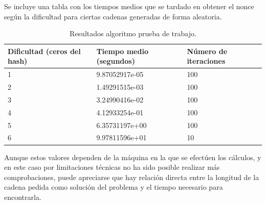 Se incluye una tabla con los tiempos medios que se tardado en obtener el nonce según la dificultad para ciertas cadenas generadas de forma aleatoria.
\begin{table}[htb]
\centering
\begin{tabular}{|l|l|l|}

\hline
Dificultad (ceros del hash)  & Tiempo medio (segundos) & Número de iteraciones \\
\hline \hline
1 & 9.87052917e-05 & 100\\ \hline
2 & 1.49291515e-03 & 100\\ \hline
3 & 3.24990416e-02 & 100\\ \hline
4 & 4.12933254e-01 & 100\\ \hline
5 & 6.35731197e+00 & 100\\ \hline
6 & 9.97811596e+01 & 10 \\ \hline
\end{tabular}
\caption{Resultados algoritmo prueba de trabajo.}
\label{tabla:anchofijo}
\end{table}

Aunque estos valores dependen de la máquina en la que se efectúen los cálculos, y en este caso por limitaciones técnicas no ha sido posible realizar más comprobaciones, puede apreciarse que hay relación directa entre la longitud de la cadena pedida como solución del problema y el tiempo necesario para encontrarla.

